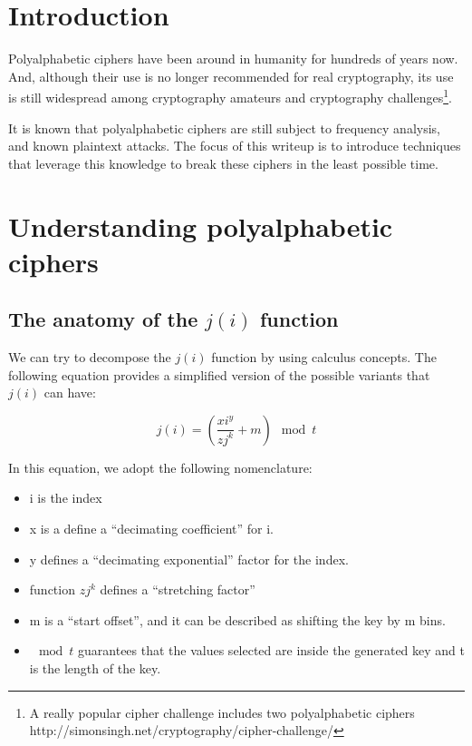 \documentclass[pdftex,12pt,letter]{article}
\begin{document}

\newpage
\tableofcontents
\newpage

\section{Introduction}

Polyalphabetic ciphers have been around in humanity for hundreds of years now.
And, although their use is no longer recommended for real cryptography, its use
is still widespread among cryptography amateurs and cryptography
challenges\footnote{A really popular cipher challenge includes two
polyalphabetic ciphers http://simonsingh.net/cryptography/cipher-challenge/}.

It is known that polyalphabetic ciphers are still subject to frequency
analysis, and known plaintext attacks. The focus of this writeup is to
introduce techniques that leverage this knowledge to break these ciphers in the
least possible time.

\section{Understanding polyalphabetic ciphers}


\subsection{The anatomy of the $j(i)$ function}

We can try to decompose the $j(i)$ function by using calculus concepts. The
following equation provides a simplified version of the possible variants that
$j(i)$ can have:

\begin{equation}
    j(i) = \left( \frac{xi^y}{zj^k} + m \right) \mod{t}
\end{equation}

In this equation, we adopt the following nomenclature:
\begin{itemize}
    \item i is the index
    \item x is a define a ``decimating coefficient'' for i.
    \item y defines a ``decimating exponential'' factor for the index.
    \item function $zj^k$ defines a ``stretching factor''
    \item m is a ``start offset'', and it can be described as shifting the key by m bins.
    \item $\mod{t}$ guarantees that the values selected are inside the generated key and t is the length of the key.
\end{itemize}
\end{document}
